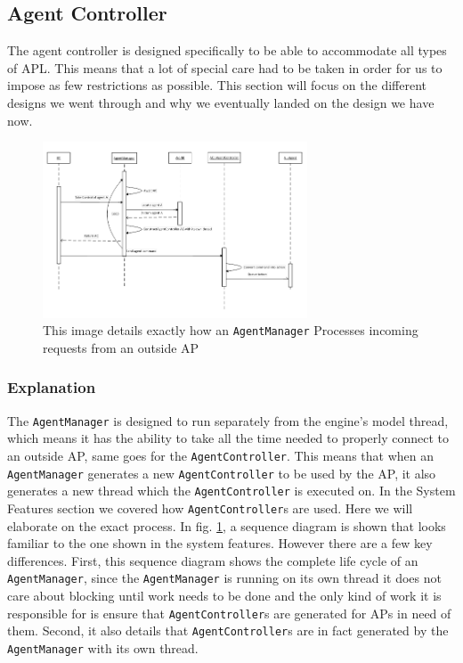 
\subsection{Agent Controller}

The agent controller is designed specifically to be able to accommodate
all types of APL. This means that a lot of special care had to be
taken in order for us to impose as few restrictions as possible. This
section will focus on the different designs we went through and why
we eventually landed on the design we have now.

\begin{figure}
\begin{centering}
\includegraphics[width=0.7\textwidth]{ImplementationAgentControllerSequenceDiagram}
\par\end{centering}

\caption{This image details exactly how an \texttt{AgentManager} Processes
incoming requests from an outside AP \label{fig:ImplementationAgentControllerSequenceDiagram}}
\end{figure}



\subsubsection*{Explanation}

The \texttt{AgentManager} is designed to run separately from the engine\textquoteright{}s
model thread, which means it has the ability to take all the time
needed to properly connect to an outside AP, same goes for the \texttt{AgentController}.
This means that when an \texttt{AgentManager} generates a new \texttt{AgentController}
to be used by the AP, it also generates a new thread which the \texttt{AgentController}
is executed on. In the System Features section we covered how \texttt{AgentController}s
are used. Here we will elaborate on the exact process. In fig. \ref{fig:ImplementationAgentControllerSequenceDiagram},
a sequence diagram is shown that looks familiar to the one shown in
the system features. However there are a few key differences. First,
this sequence diagram shows the complete life cycle of an \texttt{AgentManager},
since the \texttt{AgentManager} is running on its own thread it does
not care about blocking until work needs to be done and the only kind
of work it is responsible for is ensure that \texttt{AgentController}s
are generated for APs in need of them. Second, it also details that
\texttt{AgentController}s are in fact generated by the \texttt{AgentManager}
with its own thread.


